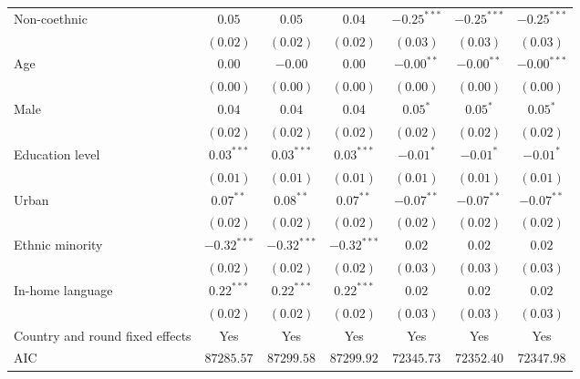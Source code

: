\begin{table}
\begin{center}
\begin{threeparttable}
\begin{tabular}{l c c c c c c}
Non-coethnic                    & $0.05$        & $0.05$        & $0.04$        & $-0.25^{***}$ & $-0.25^{***}$ & $-0.25^{***}$ \\
                                & $(0.02)$      & $(0.02)$      & $(0.02)$      & $(0.03)$      & $(0.03)$      & $(0.03)$      \\
Age                             & $0.00$        & $-0.00$       & $0.00$        & $-0.00^{**}$  & $-0.00^{**}$  & $-0.00^{***}$ \\
                                & $(0.00)$      & $(0.00)$      & $(0.00)$      & $(0.00)$      & $(0.00)$      & $(0.00)$      \\
Male                            & $0.04$        & $0.04$        & $0.04$        & $0.05^{*}$    & $0.05^{*}$    & $0.05^{*}$    \\
                                & $(0.02)$      & $(0.02)$      & $(0.02)$      & $(0.02)$      & $(0.02)$      & $(0.02)$      \\
Education level                 & $0.03^{***}$  & $0.03^{***}$  & $0.03^{***}$  & $-0.01^{*}$   & $-0.01^{*}$   & $-0.01^{*}$   \\
                                & $(0.01)$      & $(0.01)$      & $(0.01)$      & $(0.01)$      & $(0.01)$      & $(0.01)$      \\
Urban                           & $0.07^{**}$   & $0.08^{**}$   & $0.07^{**}$   & $-0.07^{**}$  & $-0.07^{**}$  & $-0.07^{**}$  \\
                                & $(0.02)$      & $(0.02)$      & $(0.02)$      & $(0.02)$      & $(0.02)$      & $(0.02)$      \\
Ethnic minority                 & $-0.32^{***}$ & $-0.32^{***}$ & $-0.32^{***}$ & $0.02$        & $0.02$        & $0.02$        \\
                                & $(0.02)$      & $(0.02)$      & $(0.02)$      & $(0.03)$      & $(0.03)$      & $(0.03)$      \\
In-home language                & $0.22^{***}$  & $0.22^{***}$  & $0.22^{***}$  & $0.02$        & $0.02$        & $0.02$        \\
                                & $(0.02)$      & $(0.02)$      & $(0.02)$      & $(0.03)$      & $(0.03)$      & $(0.03)$      \\
\midrule
Country and round fixed effects & Yes           & Yes           & Yes           & Yes           & Yes           & Yes           \\
AIC                             & $87285.57$    & $87299.58$    & $87299.92$    & $72345.73$    & $72352.40$    & $72347.98$    \\

\end{tabular}
\end{threeparttable}
\end{center}
\end{table}
